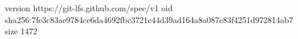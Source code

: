 version https://git-lfs.github.com/spec/v1
oid sha256:7fe3c83ae9784ce6da4692fbc3721c44d39ad164a8a087c83f4251d972814ab7
size 1472
